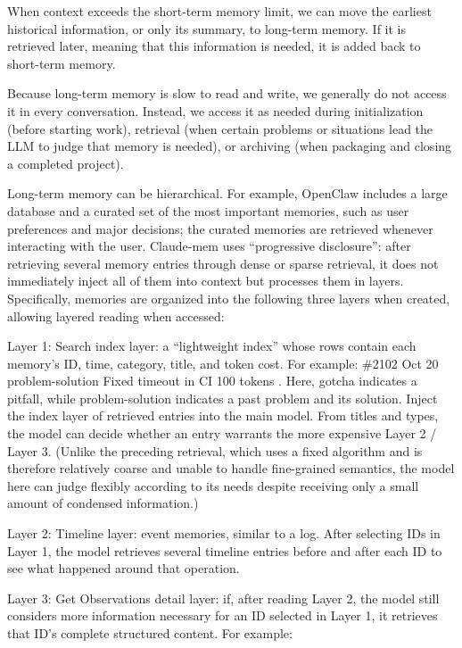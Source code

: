 When context exceeds the short-term memory limit, we can move the earliest historical information, or only its summary, to long-term memory. If it is retrieved later, meaning that this information is needed, it is added back to short-term memory.

Because long-term memory is slow to read and write, we generally do not access it in every conversation. Instead, we access it as needed during initialization (before starting work), retrieval (when certain problems or situations lead the LLM to judge that memory is needed), or archiving (when packaging and closing a completed project).

Long-term memory can be hierarchical. For example, OpenClaw includes a large database and a curated set of the most important memories, such as user preferences and major decisions; the curated memories are retrieved whenever interacting with the user. Claude-mem uses ``progressive disclosure'': after retrieving several memory entries through dense or sparse retrieval, it does not immediately inject all of them into context but processes them in layers. Specifically, memories are organized into the following three layers when created, allowing layered reading when accessed:

Layer 1: Search index layer: a ``lightweight index'' whose rows contain each memory's ID, time, category, title, and token cost. For example: \textbar{} \#2102\textbar{} Oct 20 \textbar{} problem-solution \textbar{} Fixed timeout in CI \textbar{} 100 tokens \textbar. Here, gotcha indicates a pitfall, while problem-solution indicates a past problem and its solution. Inject the index layer of retrieved entries into the main model. From titles and types, the model can decide whether an entry warrants the more expensive Layer 2 / Layer 3. (Unlike the preceding retrieval, which uses a fixed algorithm and is therefore relatively coarse and unable to handle fine-grained semantics, the model here can judge flexibly according to its needs despite receiving only a small amount of condensed information.)

Layer 2: Timeline layer: event memories, similar to a log. After selecting IDs in Layer 1, the model retrieves several timeline entries before and after each ID to see what happened around that operation.

Layer 3: Get Observations detail layer: if, after reading Layer 2, the model still considers more information necessary for an ID selected in Layer 1, it retrieves that ID's complete structured content. For example:

